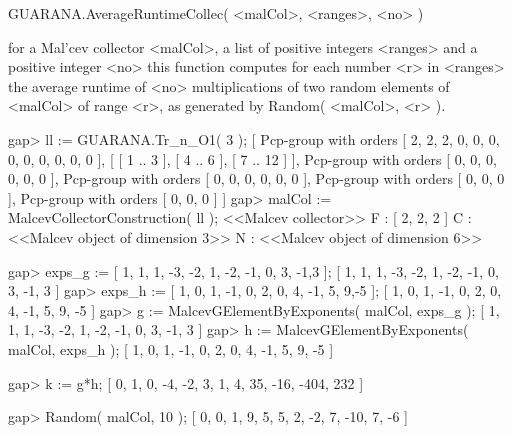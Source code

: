 \> GUARANA.AverageRuntimeCollec( <malCol>, <ranges>, <no> ) 

for a Mal'cev collector <malCol>, a list of positive integers 
<ranges> and a positive integer <no> 
this function computes for each number <r> in <ranges> 
the average runtime of <no> multiplications of 
two random elements of <malCol> of range <r>,  as generated by 
Random( <malCol>, <r> ). 


\beginexample
gap> ll := GUARANA.Tr_n_O1( 3 );
[ Pcp-group with orders [ 2, 2, 2, 0, 0, 0, 0, 0, 0, 0, 0, 0 ],
  [ [ 1 .. 3 ], [ 4 .. 6 ], [ 7 .. 12 ] ],
  Pcp-group with orders [ 0, 0, 0, 0, 0, 0 ],
  Pcp-group with orders [ 0, 0, 0, 0, 0, 0 ],
  Pcp-group with orders [ 0, 0, 0 ], Pcp-group with orders [ 0, 0, 0 ] ]
gap> malCol := MalcevCollectorConstruction( ll );
<<Malcev collector>>
  F : [ 2, 2, 2 ]
  C : <<Malcev object of dimension 3>>
  N : <<Malcev object of dimension 6>>

gap> exps_g := [ 1, 1, 1, -3, -2, 1, -2, -1, 0, 3, -1,3 ];
[ 1, 1, 1, -3, -2, 1, -2, -1, 0, 3, -1, 3 ]
gap> exps_h := [ 1, 0, 1, -1, 0, 2, 0, 4, -1, 5, 9,-5 ];
[ 1, 0, 1, -1, 0, 2, 0, 4, -1, 5, 9, -5 ]
gap> g := MalcevGElementByExponents( malCol, exps_g );
[ 1, 1, 1, -3, -2, 1, -2, -1, 0, 3, -1, 3 ]
gap> h := MalcevGElementByExponents( malCol, exps_h );
[ 1, 0, 1, -1, 0, 2, 0, 4, -1, 5, 9, -5 ]

gap> k := g*h;
[ 0, 1, 0, -4, -2, 3, 1, 4, 35, -16, -404, 232 ]

gap> Random( malCol, 10 );
[ 0, 0, 1, 9, 5, 5, 2, -2, 7, -10, 7, -6 ]
\endexample



